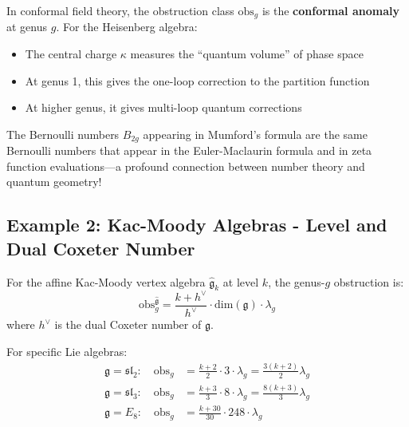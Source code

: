 \begin{remark}\label{rem:heisenberg-anomaly}
In conformal field theory, the obstruction class $\text{obs}_g$ is the 
\textbf{conformal anomaly} at genus $g$. For the Heisenberg algebra:
\begin{itemize}
\item The central charge $\kappa$ measures the ``quantum volume'' of phase space
\item At genus 1, this gives the one-loop correction to the partition function
\item At higher genus, it gives multi-loop quantum corrections
\end{itemize}

The Bernoulli numbers $B_{2g}$ appearing in Mumford's formula are the same 
Bernoulli numbers that appear in the Euler-Maclaurin formula and in zeta function 
evaluations---a profound connection between number theory and quantum geometry!
\end{remark}

\subsection{Example 2: Kac-Moody Algebras - Level and Dual Coxeter Number}
\label{subsec:kac-moody-obstruction}

\begin{theorem}\label{thm:kac-moody-obs}
For the affine Kac-Moody vertex algebra $\widehat{\mathfrak{g}}_k$ at level $k$, 
the genus-$g$ obstruction is:
\begin{equation}
\text{obs}_g^{\widehat{\mathfrak{g}}} = \frac{k + h^\vee}{h^\vee} \cdot 
\text{dim}(\mathfrak{g}) \cdot \lambda_g
\end{equation}
where $h^\vee$ is the dual Coxeter number of $\mathfrak{g}$.

For specific Lie algebras:
\begin{align}
\mathfrak{g} = \mathfrak{sl}_2: \quad \text{obs}_g &= \frac{k+2}{2} \cdot 3 \cdot \lambda_g 
= \frac{3(k+2)}{2} \lambda_g \\
\mathfrak{g} = \mathfrak{sl}_3: \quad \text{obs}_g &= \frac{k+3}{3} \cdot 8 \cdot \lambda_g 
= \frac{8(k+3)}{3} \lambda_g \\
\mathfrak{g} = E_8: \quad \text{obs}_g &= \frac{k+30}{30} \cdot 248 \cdot \lambda_g
\end{align}
\end{theorem}


